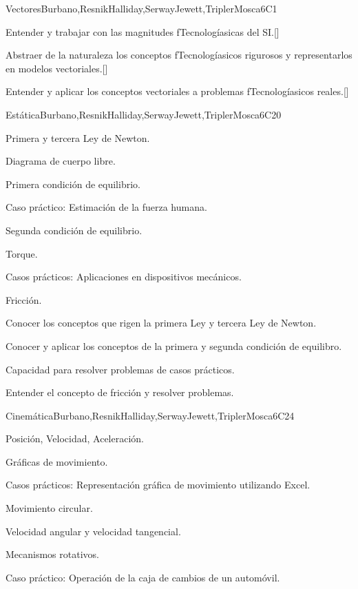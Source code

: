 \begin{syllabus}
\begin{unit}{Vectores}{}{Burbano,ResnikHalliday,SerwayJewett,TriplerMosca}{6}{C1}
   \begin{learningoutcomes}
      \item Entender y trabajar con las magnitudes fTecnologíasicas del SI.[\Usage]
      \item Abstraer de la naturaleza los conceptos fTecnologíasicos rigurosos y representarlos en modelos vectoriales.[\Usage]
      \item Entender y aplicar los conceptos vectoriales a problemas fTecnologíasicos reales.[\Usage]
   \end{learningoutcomes}
\end{unit}

\begin{unit}{}{Estática}{Burbano,ResnikHalliday,SerwayJewett,TriplerMosca}{6}{C20}
\begin{topics}
      \item Primera y tercera Ley de Newton.
      \item Diagrama de cuerpo libre.
      \item Primera condición de equilibrio.
      \item Caso práctico: Estimación de la fuerza humana.
      \item Segunda condición de equilibrio.
      \item Torque.
      \item Casos prácticos: Aplicaciones en dispositivos mecánicos.
      \item Fricción.
    \end{topics}
   \begin{learningoutcomes}
      \item Conocer los conceptos que rigen la primera Ley y tercera Ley de Newton.
      \item Conocer y aplicar los conceptos de la primera y segunda condición de equilibro.
      \item Capacidad para resolver problemas de casos prácticos.
      \item Entender el concepto de fricción y resolver problemas.
   \end{learningoutcomes}
\end{unit}

\begin{unit}{}{Cinemática}{Burbano,ResnikHalliday,SerwayJewett,TriplerMosca}{6}{C24}
\begin{topics}
      \item Posición, Velocidad, Aceleración.
      \item Gráficas de movimiento.
      \item Casos prácticos: Representación gráfica de movimiento utilizando Excel.
      \item Movimiento circular.
      \item Velocidad angular y velocidad tangencial.
      \item Mecanismos rotativos.
      \item Caso práctico: Operación de la caja de cambios de un automóvil.
   \end{topics}


\end{unit}
\end{syllabus}
